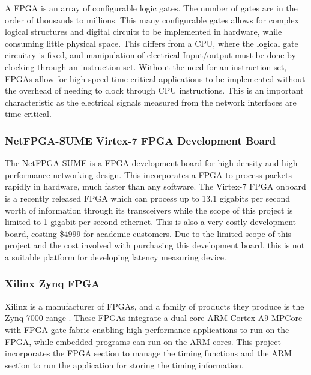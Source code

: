 \par A FPGA is an array of configurable logic gates. The number of gates are in the order of thousands to
millions. This many configurable gates allows for complex logical structures and digital circuits to be
implemented in hardware, while consuming little physical space. This differs from a CPU, where the
logical gate circuitry is fixed, and manipulation of electrical Input/output must be done by clocking
through an instruction set. Without the need for an instruction set, FPGAs allow for high speed time
critical applications to be implemented without the overhead of needing to clock through CPU
instructions. This is an important characteristic as the electrical signals measured from the network
interfaces are time critical.

\subsubsection{NetFPGA-SUME Virtex-7 FPGA Development Board}

\par The NetFPGA-SUME is a FPGA development board for high density and high-performance networking design.
This incorporates a FPGA to process packets rapidly in hardware, much faster than any software.
The Virtex-7 FPGA onboard is a recently released FPGA which can process up to 13.1 gigabits per second worth of information through its transceivers while the scope of this project is limited to 1 gigabit per second ethernet.
This is also a very costly development board, costing \$4999 \cite{SUME} for academic customers. 
Due to the limited scope of this project and the cost involved with purchasing this development board, this is not a suitable platform for developing latency measuring device.

\subsubsection{Xilinx Zynq FPGA}

Xilinx is a manufacturer of FPGAs, and a family of products they produce is the Zynq-7000 range \cite{fpga}.
These FPGAs integrate a dual-core ARM Cortex-A9 MPCore with FPGA gate fabric enabling high performance applications to run on the FPGA, while embedded programs can run on the ARM cores.
This project incorporates the FPGA section to manage the timing functions and the ARM section to run the application for storing the timing information.
